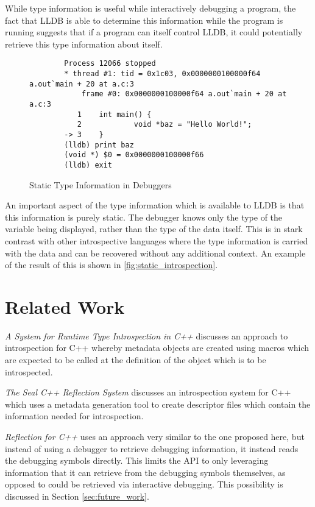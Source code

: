 \documentclass[draft]{article}
\begin{document}
While type information is useful while interactively debugging a program, the
fact that LLDB is able to determine this information while the program is
running suggests that if a program can itself control LLDB, it could potentially
retrieve this type information about itself.

\begin{figure*}[p]
	\begin{verbatim}
		Process 12066 stopped
		* thread #1: tid = 0x1c03, 0x0000000100000f64 a.out`main + 20 at a.c:3
		    frame #0: 0x0000000100000f64 a.out`main + 20 at a.c:3
		   1    int main() {
		   2            void *baz = "Hello World!";
		-> 3    }
		(lldb) print baz
		(void *) $0 = 0x0000000100000f66
		(lldb) exit
	\end{verbatim}
	\caption{Static Type Information in Debuggers}
	\label{fig:static_introspection}
\end{figure*}

An important aspect of the type information which is available to LLDB is that
this information is purely static. The debugger knows only the type of the
variable being displayed, rather than the type of the data itself. This is in
stark contrast with other introspective languages where the type information is
carried with the data and can be recovered without any additional context. An
example of the result of this is shown in \vref{fig:static_introspection}.

\section{Related Work}
\emph{A System for Runtime Type Introspection in C++}
\autocite{deBayser:2012:SRT:2415308.2415317} discusses an approach to introspection
for C++ whereby metadata objects are created using macros which are expected to
be called at the definition of the object which is to be introspected.

\emph{The Seal C++ Reflection System} \autocite{seal-cpp} discusses an introspection
system for C++ which uses a metadata generation tool to create descriptor files
which contain the information needed for introspection.

\emph{Reflection for C++} \autocite{reflection-for-cpp} uses an approach very
similar to the one proposed here, but instead of using a debugger to retrieve
debugging information, it instead reads the debugging symbols directly. This
limits the API to only leveraging information that it can retrieve from the
debugging symbols themselves, as opposed to could be retrieved via interactive
debugging. This possibility is discussed in Section \ref{sec:future_work}.
\end{document}
